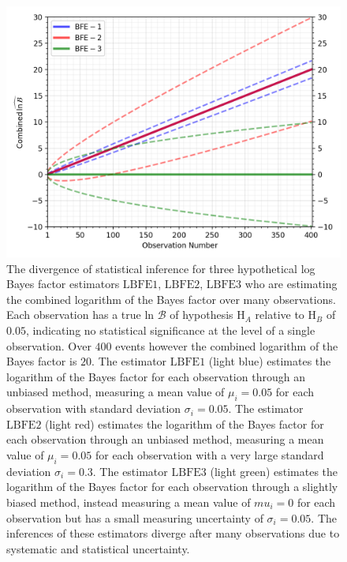 \begin{figure}[th]
  \includegraphics[width=\textwidth]{figs/chapter5/example_log_bf_divergence.png}
  \caption{The divergence of statistical inference for three hypothetical log Bayes factor estimators $\mathrm{LBFE1}$, $\mathrm{LBFE2}$, $\mathrm{LBFE3}$ who are estimating the combined logarithm of the Bayes factor over many observations. Each observation has a true ln $\mathcal{B}$ of hypothesis $\mathrm{H}_A$ relative to $\mathrm{H}_B$ of $0.05$, indicating no statistical significance at the level of a single observation. Over $400$ events however the combined logarithm of the Bayes factor is $20$. The estimator $\mathrm{LBFE1}$ (light blue) estimates the logarithm of the Bayes factor for each observation through an unbiased method, measuring a mean value of $\mu_i = 0.05$ for each observation with standard deviation $\sigma_i = 0.05$. The estimator $\mathrm{LBFE2}$ (light red) estimates the logarithm of the Bayes factor for each observation through an unbiased method, measuring a mean value of $\mu_i = 0.05$ for each observation with a very large standard deviation $\sigma_i=0.3$. The estimator $\mathrm{LBFE3}$ (light green) estimates the logarithm of the Bayes factor for each observation through a slightly biased method, instead measuring a mean value of $mu_i = 0$ for each observation but has a small measuring uncertainty of $\sigma_i=0.05$. The inferences of these estimators diverge after many observations due to systematic and statistical uncertainty.}
  \label{fig:LBFE}
\end{figure}


